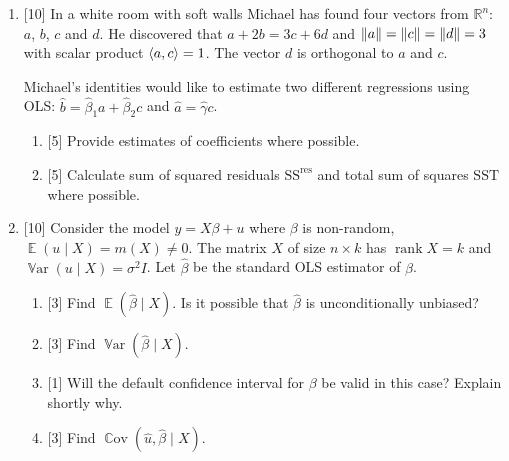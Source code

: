 \documentclass[12pt]{article}
\DeclareMathOperator{\Cov}{\mathbb{C}ov}
\DeclareMathOperator{\Var}{\mathbb{V}ar}
\DeclareMathOperator{\rank}{rank}
\DeclareMathOperator{\E}{\mathbb{E}}
\newcommand{\SST}{\text{SST}}
\newcommand{\SSR}{\text{SS}^{\text{res}}}
\newcommand{\RR}{\mathbb{R}}
\newcommand{\hb}{\hat{\beta}}
\DeclarePairedDelimiter{\norm}{\lVert}{\rVert}
\DeclarePairedDelimiter{\scalp}{\langle}{\rangle}
\begin{document}
\begin{enumerate}
    \item {[10]} In a white room with soft walls Michael has found four vectors from $\RR^n$: $a$, $b$, $c$ and $d$.
    He discovered that $a + 2b = 3c + 6d$ and $\norm{a} = \norm{c} = \norm{d} = 3$ with scalar product $\scalp{a,c} = 1$. 
    The vector $d$ is orthogonal to $a$ and $c$.

    Michael's identities would like to estimate two different regressions using OLS: $\hat b = \hb_1 a + \hb_2 c$ and $\hat a = \hat \gamma c$.
    \begin{enumerate}
        \item {[5]} Provide estimates of coefficients where possible.
        \item {[5]} Calculate sum of squared residuals $\SSR$ and total sum of squares $\SST$ where possible.
    \end{enumerate}
    

    \item {[10]} Consider the model $y = X\beta + u$ where $\beta$ is non-random, $\E(u \mid X ) = m(X) \neq 0$. 
    The matrix $X$ of size $n\times k$ has $\rank X = k$ and $\Var(u \mid X) = \sigma^2 I$.
    Let $\hb$ be the standard OLS estimator of $\beta$.

    \begin{enumerate}
        \item {[3]} Find $\E(\hb \mid X)$. Is it possible that $\hb$ is unconditionally unbiased?
        \item {[3]} Find $\Var(\hb \mid X)$.
        \item {[1]} Will the default confidence interval for $\beta$ be valid in this case? Explain shortly why. 
        \item {[3]} Find $\Cov(\hat u, \hb \mid X)$.
    \end{enumerate}


 

\end{enumerate}
\end{document}
